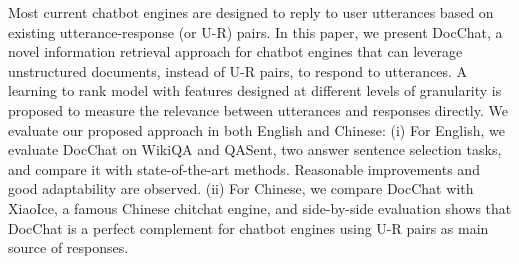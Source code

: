 Most current chatbot engines are designed to reply to user utterances based on existing utterance-response (or U-R) pairs. In this paper, we present DocChat, a novel information retrieval approach for chatbot engines that can leverage unstructured documents, instead of U-R pairs, to respond to utterances. A learning to rank model with features designed at different levels of granularity is proposed to measure the relevance between utterances and responses directly. We evaluate our proposed approach in both English and Chinese: (i) For English, we evaluate DocChat on WikiQA and QASent, two answer sentence selection tasks, and compare it with state-of-the-art methods. Reasonable improvements and good adaptability are observed. (ii) For Chinese, we compare DocChat with XiaoIce, a famous Chinese chitchat engine, and side-by-side evaluation shows that DocChat is a perfect complement for chatbot engines using U-R pairs as main source of responses.
